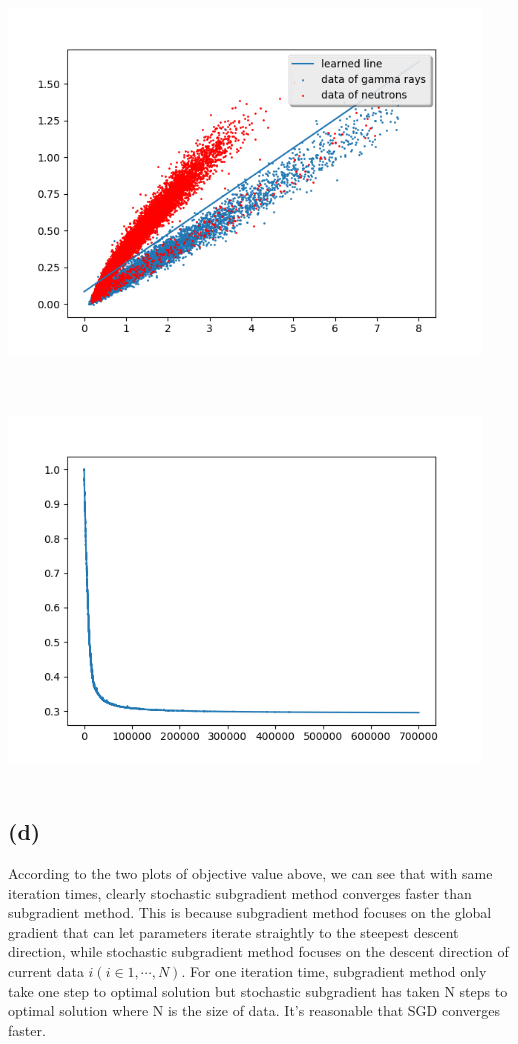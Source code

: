 \documentclass[letterpaper,11pt]{article}
\begin{document}
\begin{spacing}{1.2}
\includegraphics[width=4.95in,height=4.05in]{sto_sg_opt_smh.png}

\includegraphics[width=4.95in,height=4.05in]{sto_sg_opt_smh_J.png}

\subsection*{(d)}
According to the two plots of objective value above, we can see that with same iteration times, clearly stochastic subgradient method converges faster than subgradient method. This is because subgradient method focuses on the global gradient that can let parameters iterate straightly to the steepest descent direction, while stochastic subgradient method focuses on the descent direction of current data $i (i \in 1, \cdots, N)$. For one iteration time, subgradient method only take one step to optimal solution but stochastic subgradient has taken N steps to optimal solution where N is the size of data. It's reasonable that SGD converges faster.

\end{spacing}
\end{document}

